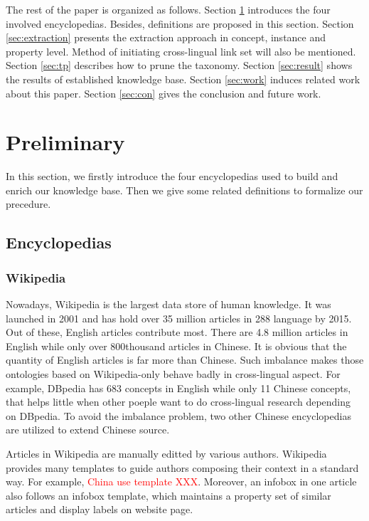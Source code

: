 \documentclass[runningheads,a4paper]{llncs}
\begin{document}
The rest of the paper is organized as follows. Section \ref{sec:pre} introduces the four involved encyclopedias. Besides, definitions are proposed in this section. Section \ref{sec:extraction} presents the extraction approach in concept, instance and property level. Method of initiating cross-lingual link set will also be mentioned. Section \ref{sec:tp} describes how to prune the taxonomy. Section \ref{sec:result} shows the results of established knowledge base. Section \ref{sec:work} induces related work about this paper. Section \ref{sec:con} gives the conclusion and future work.

\section{Preliminary}
\label{sec:pre}
In this section, we firstly introduce the four encyclopedias used to build and enrich our knowledge base. Then we give some related definitions to formalize our precedure.

\subsection{Encyclopedias}
\label{sec:encyclopedias}
\subsubsection{Wikipedia}
Nowadays, Wikipedia is the largest data store of human knowledge. It was launched in 2001 and has hold over 35 million articles in 288 language by 2015. Out of these, English articles contribute most. There are 4.8 million articles in English while only over 800thousand articles in Chinese. It is obvious that the quantity of English articles is far more than Chinese. Such imbalance makes those ontologies based on Wikipedia-only behave badly in cross-lingual aspect. For example, DBpedia has 683 concepts in English while only 11 Chinese concepts, that helps little when other poeple want to do cross-lingual research depending on DBpedia. To avoid the imbalance problem, two other Chinese encyclopedias are utilized to extend Chinese source.

Articles in Wikipedia are manually editted by various authors. Wikipedia provides many templates to guide authors composing their context in a standard way. For example, \textcolor{red}{China use template XXX}. Moreover, an infobox in one article also follows an infobox template, which maintains a property set of similar articles and display labels on website page.
\end{document}
